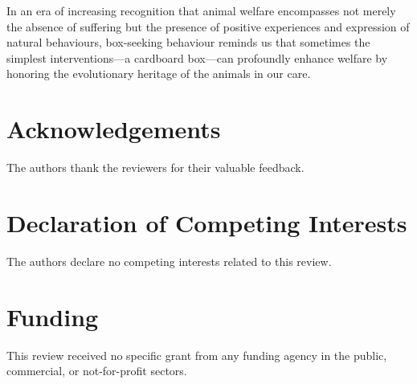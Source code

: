 \documentclass[12pt,a4paper]{article}
\begin{document}
In an era of increasing recognition that animal welfare encompasses not merely the absence of suffering but the presence of positive experiences and expression of natural behaviours, box-seeking behaviour reminds us that sometimes the simplest interventions—a cardboard box—can profoundly enhance welfare by honoring the evolutionary heritage of the animals in our care.

\section*{Acknowledgements}

The authors thank the reviewers for their valuable feedback.

\section*{Declaration of Competing Interests}

The authors declare no competing interests related to this review.

\section*{Funding}

This review received no specific grant from any funding agency in the public, commercial, or not-for-profit sectors.



\end{document}

